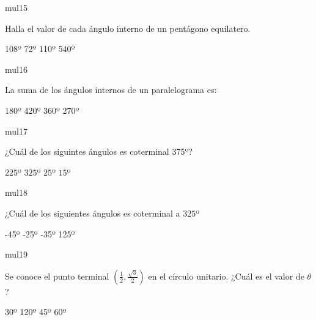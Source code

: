 \documentclass[a4paper]{article}
\begin{document}
\begin{question}{mul15}

 Halla el valor de cada ángulo interno de un pentágono equilatero.
 
        \begin{choices}
            \choice 108º
            \choice 72º
            \choice 110º
            \choice 540º
        \end{choices}

\end{question}

\begin{question}{mul16}

 La suma de los ángulos internos de un paralelograma es:
 
        \begin{choices}
            \choice 180º
            \choice 420º
            \choice 360º
            \choice 270º
        \end{choices}

\end{question}

\begin{question}{mul17}

¿Cuál de los siguintes ángulos es coterminal 375º?

        \begin{choices}
        \choice $225$º
        \choice $325$º
        \choice $25$º
        \choice $15$º
        \end{choices}
    
\end{question}

\begin{question}{mul18}

¿Cuál de los siguientes ángulos es coterminal a $325$º 

\begin{choices}
      \choice -45º
      \choice -25º
      \choice -35º
      \choice 125º
\end{choices}

\end{question}

\begin{question}{mul19}

Se conoce el punto terminal ${(\frac{1}{2},\frac{\sqrt{3}}{2})}$ en el círculo unitario. ¿Cuál es el valor de $\theta$?

\begin{choices}
    \choice 30º
    \choice 120º
    \choice 45º 
    \choice 60º
\end{choices}

\end{question}
\end{document}
